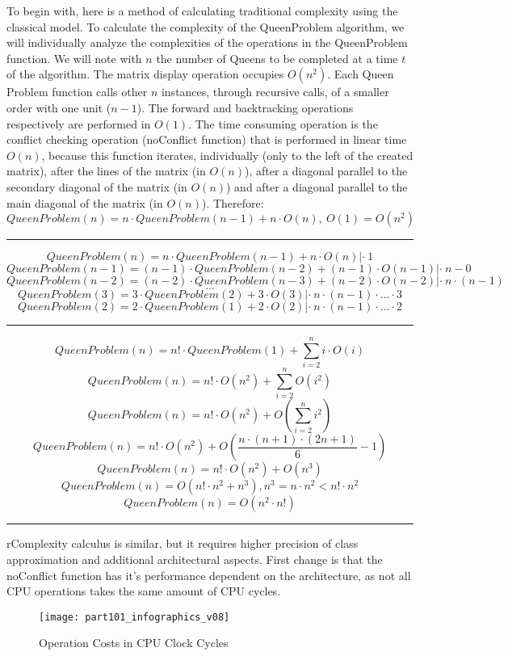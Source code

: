 To begin with, here is a method of calculating traditional complexity using the classical model.
To calculate the complexity of the QueenProblem algorithm, we will individually analyze the complexities of the operations in the QueenProblem function. We will note with $n$ the number of Queens to be completed at a time $ t $ of the algorithm.
The matrix display operation occupies $ O (n ^ 2) $.
Each Queen Problem function calls other $ n $ instances, through recursive calls, of a smaller order with one unit ($ n-1 $).
The forward and backtracking operations respectively are performed in $ O (1) $. The time consuming operation is the conflict checking operation (noConflict function) that is performed in linear time $ O (n) $, because this function iterates, individually (only to the left of the created matrix), after the lines of the matrix (in $ O (n) $), after a diagonal parallel to the secondary diagonal of the matrix (in $ O (n) $) and after a diagonal parallel to the main diagonal of the matrix (in $ O (n) $).
Therefore:
\[QueenProblem(n) = n \cdot QueenProblem(n-1) + n \cdot O(n),\ O(1)=O(n^2)\] 
\noindent\rule{16cm}{0.4pt}
\[QueenProblem(n) = n \cdot QueenProblem(n-1) + n \cdot O(n) |\cdot\ 1\]
\[QueenProblem(n-1) = (n-1) \cdot QueenProblem(n-2) + (n-1) \cdot O(n-1) |\cdot\ n-0\]
\[QueenProblem(n-2) = (n-2) \cdot QueenProblem(n-3) + (n-2) \cdot O(n-2) |\cdot\ n\cdot (n-1)\]
\[...\]
\[QueenProblem(3) = 3 \cdot QueenProblem(2) + 3 \cdot O(3) |\cdot\ n\cdot (n-1) \cdot ... \cdot 3\]
\[QueenProblem(2) = 2 \cdot QueenProblem(1) + 2 \cdot O(2) |\cdot\ n\cdot (n-1) \cdot ... \cdot 2\]
\noindent\rule{16cm}{0.4pt}
\[QueenProblem(n) = n! \cdot QueenProblem(1) + \sum_{i=2}^{n} i\cdot O(i)\]
\[QueenProblem(n) = n! \cdot O(n^2) + \sum_{i=2}^{n} O(i^2)\]
\[QueenProblem(n) = n! \cdot O(n^2) +  O(\sum_{i=2}^{n} i^2)\]
\[QueenProblem(n) = n! \cdot O(n^2) +  O(\dfrac{n\cdot(n+1)\cdot(2n+1)}{6} - 1)\]
\[QueenProblem(n) = n! \cdot O(n^2) +  O(n^3)\]
\[QueenProblem(n) = O(n! \cdot n^2 + n^3) , n^3 = n \cdot n^2 < n! \cdot n^2\]
\[QueenProblem(n) = O(n^2\cdot n!) \]
\noindent\rule{16cm}{0.4pt}


rComplexity calculus is similar, but it requires higher precision of class approximation and additional architectural aspects. 
First change is that the noConflict function has it's performance dependent on the architecture, as not all CPU operations takes the same amount of CPU cycles. 

\begin{figure}[H]
\centering
\texttt{[image: part101\_infographics\_v08]}
\caption{Operation Costs in CPU Clock Cycles\cite{archcost}}
\end{figure}

